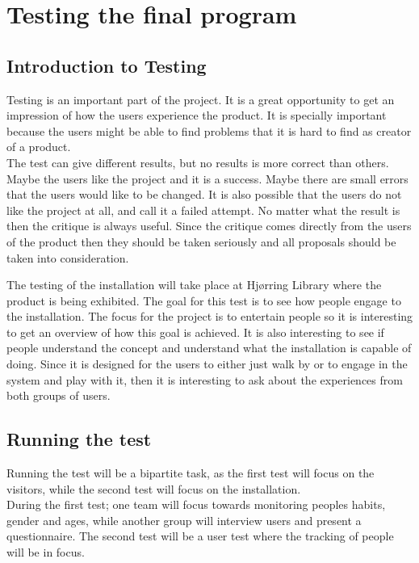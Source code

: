 \chapter{Testing the final program}
\section{Introduction to Testing}
Testing is an important part of the project. It is a great opportunity to get an impression of how the users experience the product. It is specially important because the users might be able to find problems that it is hard to find as creator of a product. \\
The test can give different results, but no results is more correct than others. Maybe the users like the project and it is a success. Maybe there are small errors that the users would like to be changed. It is also possible that the users do not like the project at all, and call it a failed attempt. No matter what the result is then the critique is always useful. Since the critique comes directly from the users of the product then they should be taken seriously and all proposals should be taken into consideration. 

The testing of the installation will take place at Hj{\o}rring Library where the product is being exhibited. The goal for this test is to see how people engage to the installation. The focus for the project is to entertain people so it is interesting to get an overview of how this goal is achieved. It is also interesting to see if people understand the concept and understand what the installation is capable of doing. Since it is designed for the users to either just walk by or to engage in the system and play with it, then it is interesting to ask about the experiences from both groups of users. \\ 

\section{Running the test}
Running the test will be a bipartite task, as the first test will focus on the visitors, while the second test will focus on the installation.\\
During the first test; one team will focus towards monitoring peoples habits, gender and ages, while another group will interview users and present a questionnaire. The second test will be a user test where the tracking of people will be in focus.

